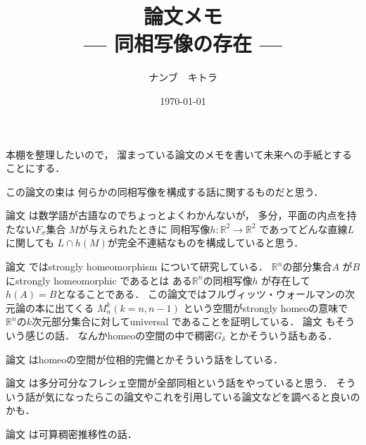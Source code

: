 \documentclass[leqno, a4paper, 12pt]{jsarticle}
\title{論文メモ
\large{\\--- 同相写像の存在 ---}
}
\author{ナンブ　キトラ}
\date{\today}
\newcommand{\rr}{\mathbb{R}}
\begin{document}
\maketitle

本棚を整理したいので，
溜まっている論文のメモを書いて未来への手紙とすることにする．


この論文の束は
何らかの同相写像を構成する話に関するものだと思う．



論文
\cite{MR1501637}
は数学語が古語なのでちょっとよくわかんないが，
多分，平面の内点を持たない$F_{\sigma}$集合
$M$が与えられたときに
同相写像$h\colon \rr^{2}\to \rr^{2}$
であってどんな直線$L$に関しても
$L\cap h(M)$が完全不連結なものを構成していると思う．




論文
\cite{MR0040648}
ではstrongly homeomorphism
について研究している．
$\rr^{n}$の部分集合$A$
が$B$
にstrongly homeomorphic 
であるとは
ある$\rr^{n}$の同相写像$h$
が存在して$h(A)=B$となることである．
この論文ではフルヴィッツ・ウォールマンの次元論の本に出てくる
$M_{n}^{k}$$(k=n, n-1)$
という空間がstrongly homeoの意味で
$\rr^{n}$の$k$次元部分集合に対してuniversal であることを証明している．
論文
\cite{MR0071000}
もそういう感じの話．
なんかhomeoの空間の中で稠密$G_{\delta}$
とかそういう話もある．

論文
\cite{MR0208576}
はhomeoの空間が位相的完備とかそういう話をしている．


論文
\cite{MR0273347}
は多分可分なフレシェ空間が全部同相という話をやっていると思う．
そういう話が気になったらこの論文やこれを引用している論文などを調べると良いのかも．

論文
\cite{MR0301711}
は可算稠密推移性の話．
\nocite{*}


\end{document}

